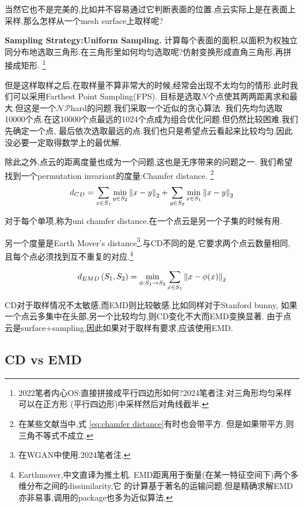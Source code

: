 当然它也不是完美的,比如并不容易通过它判断表面的位置.点云实际上是在表面上采样,那么怎样从一个mesh surface上取样呢?

\textbf{Sampling Strategy:Uniform Sampling.}
计算每个表面的面积,以面积为权独立同分布地选取三角形.在三角形里如何均匀选取呢?仿射变换形成直角三角形,再拼接成矩形.
\footnote{2022笔者内心OS:直接拼接成平行四边形如何?2024笔者注:对三角形均匀采样可以在正方形 (平行四边形)中采样然后对角线截半.}

但是这样取样之后,在取样量不算非常大的时候,经常会出现不太均匀的情形.此时我们可以采用Farthest Point Sampling(FPS).
目标是选取$N$个点使其两两距离求和最大.但这是一个$\mathcal{NP}$hard的问题.我们采取一个近似的贪心算法.
我们先均匀选取10000个点.在这10000个点最远的1024个点成为组合优化问题.但仍然比较困难.我们先确定一个点,
最后依次选取最远的点.我们也只是希望点云看起来比较均匀,因此没必要一定取得数学上的最优解.

除此之外,点云的距离度量也成为一个问题,这也是无序带来的问题之一.
我们希望找到一个permutation invariant的度量:Chamfer distance.
\footnote{在某些文献当中,式 \ref{eq:chamfer distance}有时也会带平方.
但是如果带平方,则三角不等式不成立.}
\begin{equation}
    d_{CD} = \sum_{x \in S_1} \min_{y \in S_2} \left \Vert x - y \right \Vert_{2} + \sum_{y \in S_2} \min_{x \in S_1} \left \Vert x - y \right \Vert_{2}
    \label{eq:chamfer distance}
\end{equation}

对于每个单项,称为uni chamfer distance.在一个点云是另一个子集的时候有用.

另一个度量是Earth Mover's distance\footnote{在WGAN中使用.2024笔者注.}.与CD不同的是,它要求两个点云数量相同,
且每个点必须找到互不重复的对应.\footnote{Earthmover,中文直译为推土机.
EMD距离用于衡量(在某一特征空间下)两个多维分布之间的dissimilarity,它
的计算基于著名的运输问题.但是精确求解EMD亦非易事,调用的package也多为近似算法.}

\begin{equation}
    d_{E M D}\left(S_{1}, S_{2}\right)=\min _{\phi: S_{1} \rightarrow S_{2}} \sum_{x \in S_{1}} \left \Vert x-\phi(x) \right \Vert_{2}
\end{equation}

CD对于取样情况不太敏感,而EMD则比较敏感.比如同样对于Stanford bunny,
如果一个点云多集中在头部,另一个比较均匀,则CD变化不大而EMD变换显著.
由于点云是surface+sampling,因此如果对于取样有要求,应该使用EMD.

\subsection{CD vs EMD}

